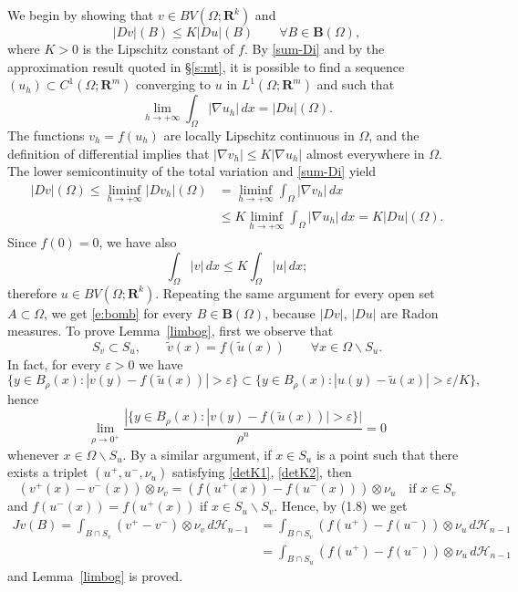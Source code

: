 \documentclass[draft]{amsart}
\theoremstyle{definition}
\theoremstyle{remark}
\newcommand{\secref}[1]{\S\ref{#1}}
\newcommand{\lemref}[1]{Lemma~\ref{#1}}
\begin{document}
\begin{pf}
 We begin by showing that $v\in BV(\Omega;\mathbf{R}^k)$ and
\begin{equation}\label{e:bomb}
|Dv|(B)\le K|Du|(B)\qquad\forall B\in\mathbf{B}(\Omega ),\end{equation}
where $K>0$ is the Lipschitz constant of $f$. By \eqref{sum-Di}
and by the approximation
result quoted in \secref{s:mt},
it is possible to find a sequence $(u_h)\subset C^1(\Omega ;\mathbf{R}^m)$
converging to $u$ in $L^1(\Omega ;\mathbf{R}^m)$ and such that
\[\lim_{h\to +\infty}\int_\Omega |\nabla u_h|\,dx=|Du|(\Omega ).\]
The functions $v_h=f(u_h)$ are locally Lipschitz continuous in $\Omega $,
and the definition of differential implies that $|\nabla v_h|\le K|\nabla
u_h|$ almost everywhere in $\Omega $. The lower semicontinuity of the total
variation and \eqref{sum-Di} yield
\begin{equation}
\begin{split}
|Dv|(\Omega )\le\liminf_{h\to +\infty}|Dv_h|(\Omega) &
=\liminf_{h\to +\infty}\int_\Omega |\nabla v_h|\,dx\\
&\le K\liminf_{h\to +\infty}\int_\Omega
|\nabla u_h|\,dx=K|Du|(\Omega).
\end{split}\end{equation}
Since $f(0)=0$, we have also
\[\int_\Omega |v|\,dx\le K\int_\Omega |u|\,dx;\]
therefore $u\in BV(\Omega ;\mathbf{R}^k)$. Repeating the same argument for
every open set $A\subset\Omega $, we get \eqref{e:bomb}
for every $B\in\mathbf{B}(\Omega)$,
because $|Dv|$, $|Du|$ are Radon measures. To prove \lemref{limbog},
first we observe that
\begin{equation}\label{e:SS}
S_v\subset S_u,\qquad\tilde v(x)=f(\tilde u(x))\qquad \forall x\in\Omega
\backslash S_u.\end{equation}
In fact, for every $\varepsilon >0$ we have
\[\{y\in B_\rho(x): |v(y)-f(\tilde u(x))|>\varepsilon \}\subset \{y\in
B_\rho(x): |u(y)-\tilde u(x)|>\varepsilon /K\},\]
hence
\[\lim_{\rho\to 0^+}\frac{|\{y\in B_\rho(x): |v(y)-f(\tilde u(x))|>
\varepsilon \}|}{\rho^n}=0\]
whenever $x\in\Omega \backslash S_u$.
By a similar argument, if $x\in S_u$ is a point such that there exists
a triplet $(u^+,u^-,\nu_u)$ satisfying \eqref{detK1}, \eqref{detK2}, then
\[
(v^+(x)-v^-(x))\otimes \nu_v=(f(u^+(x))-f(u^-(x)))\otimes\nu_u\quad
\text{if }x\in S_v
\]
and $f(u^-(x))=f(u^+(x))$ if $x\in S_u\backslash S_v$. Hence, by (1.8) we get
\begin{equation*}\begin{split}
Jv(B)=\int_{B\cap S_v}(v^+-v^-)\otimes \nu_v\,d\mathcal{H}_{n-1}&=
\int_{B\cap S_v}(f(u^+)-f(u^-))\otimes \nu_u\,d\mathcal{H}_{n-1}\\
&=\int_{B\cap S_u}(f(u^+)-f(u^-))\otimes \nu_u\,d\mathcal{H}_{n-1}
\end{split}\end{equation*}
and \lemref{limbog} is proved.
\end{pf}
\end{document}
